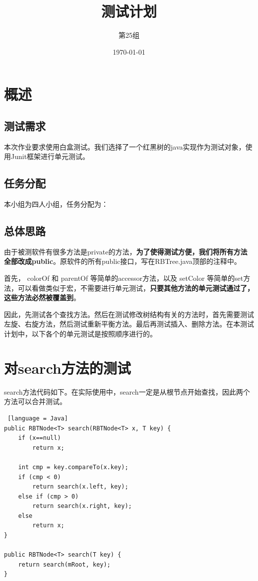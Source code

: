 \documentclass[12pt, a4paper, oneside]{ctexart}
\title{\textbf{测试计划}}
\author{第25组}
\date{\today}
\begin{document}
\maketitle
\section{概述}
\subsection{测试需求}
本次作业要求使用白盒测试。我们选择了一个红黑树的java实现作为测试对象，使用Junit框架进行单元测试。

\subsection{任务分配}
本小组为四人小组，任务分配为：

\subsection{总体思路}
由于被测软件有很多方法是private的方法，\textbf{为了使得测试方便，我们将所有方法全部改成public}。原软件的所有public接口，写在RBTree.java顶部的注释中。

首先， colorOf 和 parentOf 等简单的accessor方法，以及 setColor 等简单的set方法，可以看做类似于宏，不需要进行单元测试，\textbf{只要其他方法的单元测试通过了，这些方法必然被覆盖到}。

因此，先测试各个查找方法。然后在测试修改树结构有关的方法时，首先需要测试左旋、右旋方法，然后测试重新平衡方法。最后再测试插入、删除方法。在本测试计划中，以下各个的单元测试是按照顺序进行的。


\section{对search方法的测试}

search方法代码如下。在实际使用中，search一定是从根节点开始查找，因此两个方法可以合并测试。

\begin{lstlisting} [language = Java]
public RBTNode<T> search(RBTNode<T> x, T key) {
    if (x==null)
        return x;

    int cmp = key.compareTo(x.key);
    if (cmp < 0)
        return search(x.left, key);
    else if (cmp > 0)
        return search(x.right, key);
    else
        return x;
}

public RBTNode<T> search(T key) {
    return search(mRoot, key);
}
\end{lstlisting}
\end{document}
